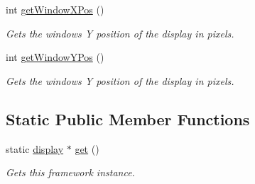 \begin{DoxyCompactItemize}
int \hyperlink{classflounder_1_1display_adbf55bdf135324664810751f3ab27d82}{get\+Window\+X\+Pos} ()
\begin{DoxyCompactList}\small\item\em Gets the windows Y position of the display in pixels. \end{DoxyCompactList}\item 
int \hyperlink{classflounder_1_1display_a92e7674dcd56f1e3f8b617a9b3fb625d}{get\+Window\+Y\+Pos} ()
\begin{DoxyCompactList}\small\item\em Gets the windows Y position of the display in pixels. \end{DoxyCompactList}\end{DoxyCompactItemize}
\subsection*{Static Public Member Functions}
\begin{DoxyCompactItemize}
\item 
static \hyperlink{classflounder_1_1display}{display} $\ast$ \hyperlink{classflounder_1_1display_a7c7015939f48bf4526bb0330ea4fcd2f}{get} ()
\begin{DoxyCompactList}\small\item\em Gets this framework instance. \end{DoxyCompactList}\end{DoxyCompactItemize}
